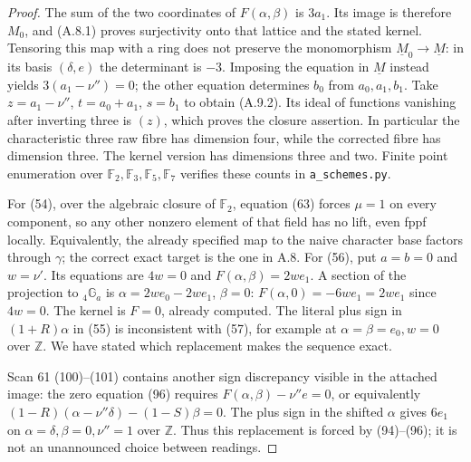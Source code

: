 \begin{proof}
The sum of the two coordinates of $F(\alpha,\beta)$ is $3a_1$.
Its image is therefore $M_0$, and (A.8.1) proves surjectivity onto
that lattice and the stated kernel. Tensoring this map with a ring
does not preserve the monomorphism $\underline M_0\to\underline M$:
in its basis $(\delta,e)$ the determinant is $-3$. Imposing the
equation in $\underline M$ instead yields $3(a_1-\nu'')=0$;
the other equation determines $b_0$ from $a_0,a_1,b_1$.
Take $z=a_1-\nu''$, $t=a_0+a_1$, $s=b_1$ to obtain (A.9.2).
Its ideal of functions vanishing after inverting three is $(z)$,
which proves the closure assertion. In particular the characteristic
three raw fibre has dimension four, while the corrected fibre has
dimension three. The kernel version has dimensions three and two.
Finite point enumeration over $\mathbb F_2,\mathbb F_3,\mathbb F_5,
\mathbb F_7$ verifies these counts in \texttt{a\_schemes.py}.

For (54), over the algebraic closure of $\mathbb F_2$, equation (63)
forces $\mu=1$ on every component, so any other nonzero element of
that field has no lift, even fppf locally. Equivalently, the already
specified map to the naive character base factors through $\gamma$;
the correct exact target is the one in A.8. For (56), put
$a=b=0$ and $w=\nu'$. Its equations are $4w=0$ and
$F(\alpha,\beta)=2w e_1$. A section of the projection to
${}_4\mathbb G_a$ is
$\alpha=2w e_0-2w e_1$, $\beta=0$:
$F(\alpha,0)=-6w e_1=2w e_1$ since $4w=0$.
The kernel is $F=0$, already computed. The literal plus sign in
$(1+R)\alpha$ in (55) is inconsistent with (57), for example at
$\alpha=\beta=e_0,w=0$ over $\mathbb Z$. We have stated which
replacement makes the sequence exact.

Scan 61 (100)--(101) contains another sign discrepancy visible in
the attached image: the zero equation (96) requires
$F(\alpha,\beta)-\nu''e=0$, or equivalently
$(1-R)(\alpha-\nu''\delta)-(1-S)\beta=0$.
The plus sign in the shifted $\alpha$ gives $6e_1$ on
$\alpha=\delta,\beta=0,\nu''=1$ over $\mathbb Z$.
Thus this replacement is forced by (94)--(96); it is not an
unannounced choice between readings.
\end{proof}


